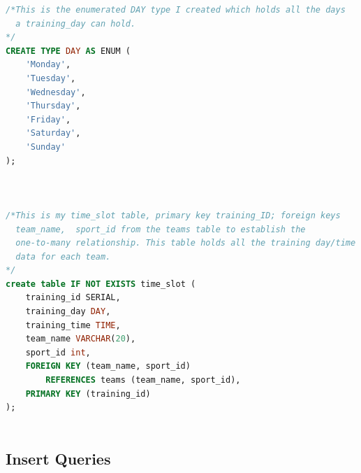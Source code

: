 \documentclass[11pt, article]{article}
\begin{document}
\begin{lstlisting}[language=sql]
/*This is the enumerated DAY type I created which holds all the days 
  a training_day can hold.
*/
CREATE TYPE DAY AS ENUM (
  	'Monday',
  	'Tuesday',
  	'Wednesday',
 	'Thursday',
 	'Friday',
  	'Saturday',
  	'Sunday'
);



/*This is my time_slot table, primary key training_ID; foreign keys 
  team_name,  sport_id from the teams table to establish the 
  one-to-many relationship. This table holds all the training day/time
  data for each team.
*/
create table IF NOT EXISTS time_slot (
	training_id SERIAL,
	training_day DAY,
	training_time TIME,
	team_name VARCHAR(20),
	sport_id int,	
	FOREIGN KEY (team_name, sport_id) 
		REFERENCES teams (team_name, sport_id),
	PRIMARY KEY (training_id)
);
	
	\end{lstlisting}


	\subsection{Insert Queries}
	
\end{document}
